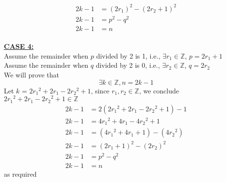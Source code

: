 \documentclass[20pt]{article}
\begin{document}
\begin{enumerate}
\begin{align*}
    2k - 1 &= (2r_1)^2 - (2r_2 + 1)^2 \\
    2k - 1 &= p^2 - q^2 \\
    2k - 1 &= n \tag{By assumption, $n = p^2 - q^2$}
\end{align*}\\
\underline{\textbf{CASE 4:}} \\
Assume the remainder when $p$ divided by 2 is 1, i.e., $\exists r_1 \in \mathbb{Z}$, $p = 2r_1 + 1$\\
Assume the remainder when $q$ divided by 2 is 0, i.e., $\exists r_2 \in \mathbb{Z}$, $q = 2r_2$\\
We will prove that 
\[\exists k \in\mathbb{Z}, n = 2k -1\]
Let $k$ = $2{r_1}^2 + 2r_1 - 2{r_2}^2 + 1$, since $r_1, r_2 \in \mathbb{Z}$, we conclude $2{r_1}^2 + 2r_1 - 2{r_2}^2 + 1 \in \mathbb{Z}$
\begin{align*}
    2k - 1 &= 2(2{r_1}^2 + 2r_1 - 2{r_2}^2 + 1) - 1\\
    2k - 1 &= 4{r_1}^2 + 4r_1 - 4{r_2}^2 + 1 \\
    2k - 1 &= (4{r_1}^2 + 4r_1 + 1) - (4{r_2}^2) \\
    2k - 1 &= (2r_1 + 1)^2 - (2r_2)^2 \\
    2k - 1 &= p^2 - q^2 \\
    2k - 1 &= n \tag{By assumption, $n = p^2 - q^2$}
\end{align*}
as required \hfill \Box\\\\\\\\
\end{enumerate}
\end{document}
